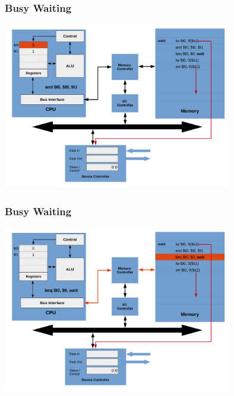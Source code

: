 \documentclass{beamer}
\begin{document}
\begin{frame}%
\frametitle{Busy Waiting}

\vspace*{-0.2cm}
\begin{center}
\hspace*{-1cm}\includegraphics[width=10cm]{busy_waiting7.pdf}
\end{center}

\end{frame}

\begin{frame}%
\frametitle{Busy Waiting}

\vspace*{-0.2cm}
\begin{center}
\hspace*{-1cm}\includegraphics[width=10cm]{busy_waiting8.pdf}
\end{center}

\end{frame}
\end{document}
